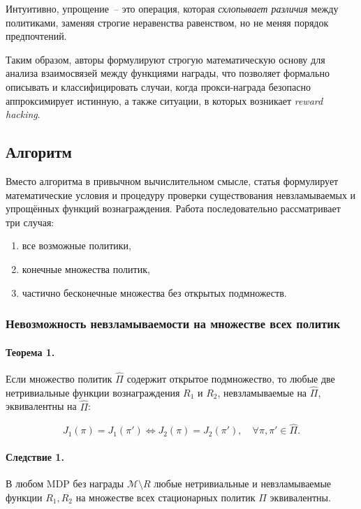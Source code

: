 Интуитивно, упрощение~-- это операция, которая \emph{схлопывает различия} между политиками,
заменяя строгие неравенства равенством, но не меняя порядок предпочтений.

Таким образом, авторы формулируют строгую математическую основу для анализа взаимосвязей между функциями награды,
что позволяет формально описывать и классифицировать случаи, когда прокси-награда безопасно аппроксимирует истинную,
а также ситуации, в которых возникает \emph{reward hacking}.


\subsection{Алгоритм}

Вместо алгоритма в привычном вычислительном смысле, статья формулирует математические условия и процедуру проверки существования невзламываемых и упрощённых функций вознаграждения.
Работа последовательно рассматривает три случая:

\begin{enumerate}
    \item все возможные политики,
    \item конечные множества политик,
    \item частично бесконечные множества без открытых подмножеств.
\end{enumerate}

\subsubsection{Невозможность невзламываемости на множестве всех политик}

\begin{theorem}
\label{th:unhackable_equivalence}
\paragraph{Теорема 1.} Если множество политик $\widehat{\Pi}$ содержит открытое подмножество, то любые две нетривиальные функции вознаграждения $R_1$ и $R_2$, невзламываемые на $\widehat{\Pi}$, эквивалентны на $\widehat{\Pi}$:

\begin{equation}
J_1(\pi) = J_1(\pi') \iff J_2(\pi) = J_2(\pi'), \quad \forall \pi, \pi' \in \widehat{\Pi}.
\end{equation}

\end{theorem}

\begin{corollary}
\label{cor:unhackable_equivalence}
\paragraph{Следствие 1.} В любом MDP без награды $\mathcal{M} \setminus R$ любые нетривиальные и невзламываемые функции $R_1, R_2$ на множестве всех стационарных политик $\Pi$ эквивалентны.
\end{corollary}


